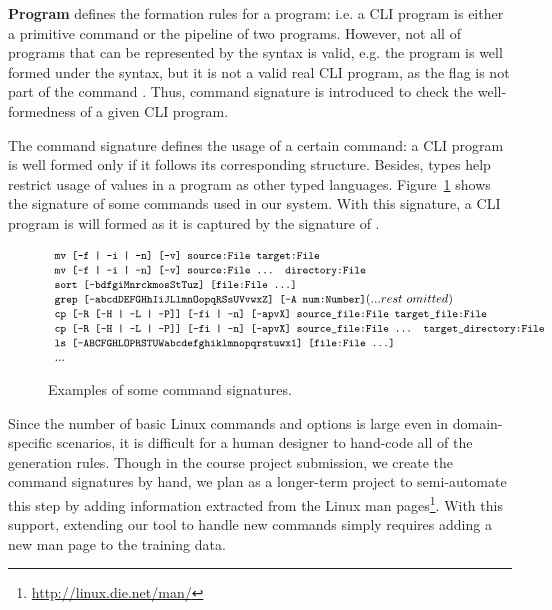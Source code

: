 \textbf{Program} defines the formation rules for a program: i.e. a CLI program is either a primitive command or the pipeline of two programs. However, not all of programs that can be represented by the syntax is valid, e.g. the program  is well formed under the syntax, but it is not a valid real CLI program, as the  flag is not part of the command . Thus, command signature is introduced to check the well-formedness of a given CLI program. 

The command signature defines the usage of a certain command: a CLI program is well formed only if it follows its corresponding structure. Besides, types help restrict usage of values in a program as other typed languages. Figure~\ref{fig:cmdsig} shows the signature of some commands used in our system. With this signature, a CLI program  is will formed as it is captured by the signature of .

\begin{figure}[ht]
\[
\begin{array}{l}

\code{mv [-f | -i | -n] [-v] source:File target:File}\\
\code{mv [-f | -i | -n] [-v] source:File ... directory:File}\\
\code{sort [-bdfgiMnrckmosStTuz] [file:File ...]}\\
\code{grep [-abcdDEFGHhIiJLlmnOopqRSsUVvwxZ] [-A num:Number]} (... rest~omitted)\\
\code{cp [-R [-H | -L | -P]] [-fi | -n] [-apvX] source\_file:File target\_file:File}\\
\code{cp [-R [-H | -L | -P]] [-fi | -n] [-apvX] source\_file:File ... target\_directory:File}\\
\code{ls [-ABCFGHLOPRSTUW\@abcdefghiklmnopqrstuwx1] [file:File ...]}\\
...
\end{array}
\]
\vspace{-15pt}
\caption{Examples of some command signatures.}
\label{fig:cmdsig}
\end{figure}

Since the number of basic Linux commands and options is large even in domain-specific scenarios, it is difficult for a human designer to hand-code all of the generation rules. Though in the course project submission, we create the command signatures by hand, we plan as a longer-term project to semi-automate this step by adding information extracted from the Linux man pages\footnote{\url{http://linux.die.net/man/}}. With this support, extending our tool to handle new commands simply requires adding a new man page to the training data.

